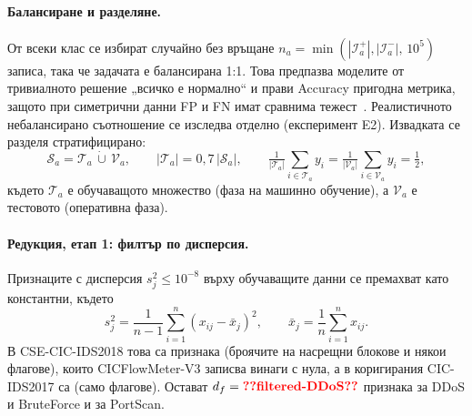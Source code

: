 \paragraph{Балансиране и разделяне.} От всеки клас се избират случайно без връщане $n_a=\min(|\mathcal{I}_a^{+}|,|\mathcal{I}_a^{-}|,\,10^5)$ записа, така че задачата е балансирана 1:1. Това предпазва моделите от тривиалното решение „всичко е нормално“ и прави Accuracy пригодна метрика, защото при симетрични данни FP и FN имат сравнима тежест~\cite{borovska2022}. Реалистичното небалансирано съотношение се изследва отделно (експеримент E2). Извадката се разделя стратифицирано:
\begin{equation}\label{eq:split}
\mathcal{S}_a=\mathcal{T}_a\,\dot\cup\,\mathcal{V}_a,\qquad |\mathcal{T}_a| = 0{,}7\,|\mathcal{S}_a|,\qquad \tfrac{1}{|\mathcal{T}_a|}\textstyle\sum_{i\in\mathcal{T}_a}y_i=\tfrac{1}{|\mathcal{V}_a|}\sum_{i\in\mathcal{V}_a}y_i=\tfrac12,
\end{equation}
където $\mathcal{T}_a$ е обучаващото множество (фаза на машинно обучение), а $\mathcal{V}_a$ е тестовото (оперативна фаза).

\paragraph{Редукция, етап 1: филтър по дисперсия.} Признаците с дисперсия $s_j^2\le 10^{-8}$ върху обучаващите данни се премахват като константни, където
\begin{equation}\label{eq:var}
s_j^2=\frac{1}{n-1}\sum_{i=1}^{n}\left(x_{ij}-\bar{x}_j\right)^2,\qquad \bar{x}_j=\frac{1}{n}\sum_{i=1}^{n}x_{ij}.
\end{equation}
В CSE-CIC-IDS2018 това са  признака (броячите на насрещни блокове и някои флагове), които CICFlowMeter-V3 записва винаги с нула, а в коригирания CIC-IDS2017 са  (само флагове). Остават $d_f=\val{filtered-DDoS}$ признака за DDoS и BruteForce и  за PortScan.

